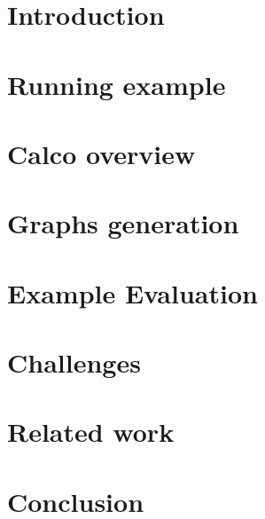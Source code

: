 \documentclass[sigconf]{acmart}
\theoremstyle{remark}
\begin{document}



\maketitle

\thispagestyle{empty}

\section{Introduction}


\section{Running example}


\section{Calco overview}


\section{Graphs generation}


\section{Example Evaluation}


\section{Challenges}
 

\section{Related work}


\section{Conclusion}




\end{document}
